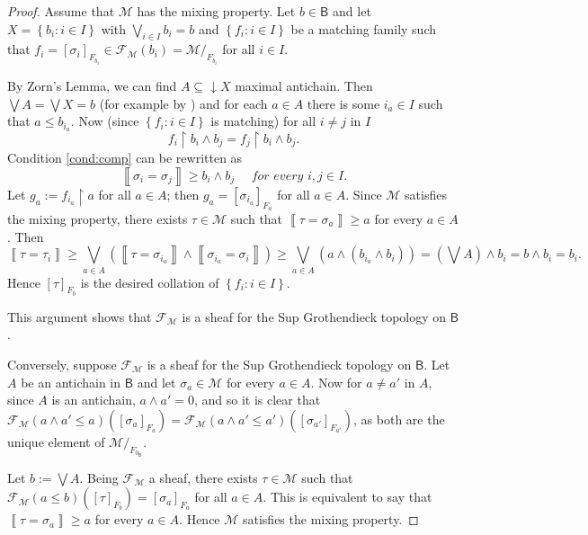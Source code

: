 \documentclass[11pt]{amsart}
\newcommand{\F}{\mathcal{F}}
\theoremstyle{plain}
\theoremstyle{definition}
\theoremstyle{plain}
\theoremstyle{remark}
\newcommand{\M}{\mathcal{M}}
\newcommand{\bool}[1]{\mathsf{#1}}
\newcommand{\Qp}[1]{\left\llbracket #1 \right\rrbracket}
\newcommand{\bp}[1]{\left\lbrace #1 \right\rbrace}
\newcommand{\0}{\mathsf{0}}
\renewcommand{\1}{\mathsf{1}}
\renewcommand{\2}{\mathsf{2}}
\theoremstyle{definition}
\begin{document}
\begin{proof}
Assume that $\M$ has the mixing property.
Let $b\in\bool{B}$ and let $X=\bp{b_i: i\in I}$ with $\bigvee_{i\in I}b_i=b$ and $\bp{f_i:i\in I}$ be a matching family such that $f_i=[\sigma_i]_{F_{b_i}}\in \F_\M(b_i)=\M/_{F_{b_i}}$ for all $i\in I$.

By Zorn's Lemma, we can find $A\subseteq \downarrow X$ maximal antichain. Then $\bigvee A=\bigvee X=b$ (for example by \cite[Fact 3.11.7]{viale-bookonforcing})
and for each $a\in A$ there is some $i_a\in I$ such that $a\leq b_{i_a}$.
%
Now (since $\bp{f_i:i\in I}$ is matching) for all
$i\neq j$ in $I$ 
\begin{equation}
\label{cond:comp}
f_i\restriction b_i\wedge b_j=f_j\restriction b_i\wedge b_j.
\end{equation}
Condition \eqref{cond:comp} can be rewritten as
\[
\Qp{\sigma_i=\sigma_j}\geq b_i\wedge b_j\quad\textit{ for every $i, j\in I$}.
\]
 Let $g_a:=f_{i_a}\restriction a$ for all $a\in A$; then
$g_a=[\sigma_{i_a}]_{F_{a}}$ for all $a\in A$.
Since $\M$ satisfies the mixing property, there exists $\tau\in\M$ such that $\Qp{\tau=\sigma_a}\geq a$ for every $a\in A$.
Then
\[
\Qp{\tau=\tau_i}\geq\bigvee_{a\in A}(\Qp{\tau=\sigma_{i_a}}\wedge\Qp{\sigma_{i_a}=\sigma_i})\geq \bigvee_{a\in A}(a \wedge (b_{i_a}\wedge b_i))=(\bigvee A) \wedge b_i=b\wedge b_i=b_i.
\]
Hence $[\tau]_{F_b}$ is the desired collation of $\bp{f_i:i\in I}$.

This argument shows that $\F_\M$ is a sheaf for the Sup Grothendieck topology on $\bool{B}$. 


Conversely, suppose $\F_\M$ is a sheaf for the Sup Grothendieck topology on $\bool{B}$. 
 Let $A$ be an antichain in $\bool{B}$ and let $\sigma_a\in\M$ for every $a\in A$.
 Now for $a\neq a'$ in $A$, since $A$ is an antichain, $a\wedge a'=0$, and so it is clear that 
$\F_\M(a\wedge a'\leq a)([\sigma_a]_{F_a})=\F_\M(a\wedge a'\leq a')([\sigma_{a'}]_{F_{a'}})$, as both are the unique element of $\M/_{F_{0_\bool{B}}}$.

Let $b:=\bigvee A$.
Being $\F_\M$ a sheaf, there exists $\tau\in\M$ such that $\F_\M(a\leq b)([\tau]_{F_b})=[\sigma_a]_{F_a}$ for all $a\in A.$ This is equivalent to say that $\Qp{\tau=\sigma_a}\geq a$ for every $a\in A$. 
Hence $\M$ satisfies the mixing property.
\end{proof}
\end{document}
